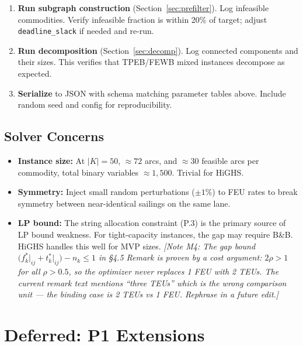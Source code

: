 \documentclass[11pt,a4paper]{article}
\theoremstyle{definition}
\begin{document}
\begin{enumerate}
  \item \textbf{Run subgraph construction} (Section~\ref{sec:prefilter}).
    Log infeasible commodities. Verify infeasible fraction is within 20\% of target;
    adjust \texttt{deadline\_slack} if needed and re-run.

  \item \textbf{Run decomposition} (Section~\ref{sec:decomp}). Log connected components and
    their sizes. This verifies that TPEB/FEWB mixed instances decompose as expected.

  \item \textbf{Serialize} to JSON with schema matching parameter tables above.
    Include random seed and config for reproducibility.
\end{enumerate}

\subsection{Solver Concerns}
\label{sec:solver}

\begin{itemize}[noitemsep]
  \item \textbf{Instance size:} At $|K|=50$, $\approx 72$ arcs, and $\approx 30$ feasible arcs per commodity, total binary variables $\approx 1{,}500$. Trivial for HiGHS.
  \item \textbf{Symmetry:} Inject small random perturbations ($\pm 1\%$) to FEU rates to break
        symmetry between near-identical sailings on the same lane.
  \item \textbf{LP bound:} The string allocation constraint (P.3) is the primary source of LP bound weakness. For tight-capacity instances, the gap may require B\&B. HiGHS handles this well for MVP sizes.
        \textit{[Note M4: The gap bound $\bigl(f_k^*\big|_{ij} + t_k^*\big|_{ij}\bigr) - n_k \leq 1$
        in §4.5 Remark is proven by a cost argument: $2\rho > 1$ for all $\rho > 0.5$, so the
        optimizer never replaces 1 FEU with 2 TEUs. The current remark text mentions ``three TEUs''
        which is the wrong comparison unit --- the binding case is 2 TEUs vs 1 FEU. Rephrase in
        a future edit.]}
\end{itemize}

\section{Deferred: P1 Extensions}
\label{sec:deferred}
\end{document}
